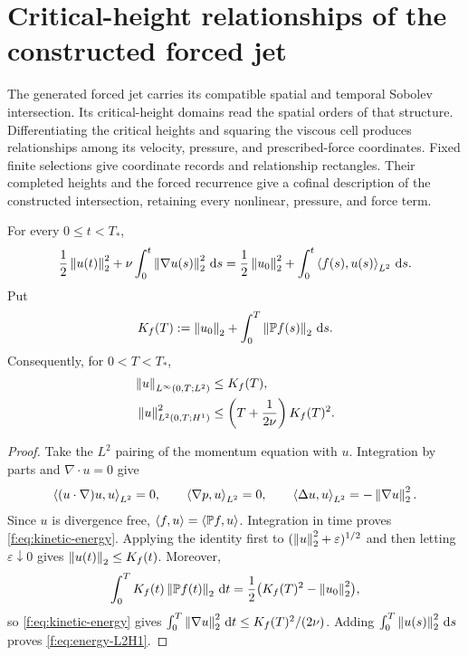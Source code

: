 \section{Critical-height relationships of the constructed forced jet}
\label{f:sec:compatible-rectangles}

The generated forced jet carries its compatible spatial and temporal Sobolev
intersection. Its critical-height domains read the spatial orders of that
structure. Differentiating the critical heights and squaring the viscous cell
produces relationships among its velocity, pressure, and prescribed-force
coordinates. Fixed finite selections give coordinate records and relationship
rectangles. Their completed heights and the forced recurrence give a cofinal
description of the constructed intersection, retaining every nonlinear,
pressure, and force term.


\begin{proposition}
\label{f:prop:kinetic-energy}
For every \(0\le t<T_*\),
\begin{equation}
 \frac12\left\lVert u(t)\right\rVert_2^2
 +\nu\int_0^t\left\lVert \nabla u(s)\right\rVert_2^2\,\mathrm d s
 =\frac12\left\lVert u_0\right\rVert_2^2
 +\int_0^t\left\langle f(s),u(s)\right\rangle_{L^2}\,\mathrm d s.
 \label{f:eq:kinetic-energy}
\end{equation}
Put
\[
 K_f(T):=\left\lVert u_0\right\rVert_2+\int_0^T\left\lVert \mathbb P f(s)\right\rVert_2\,\mathrm d s.
\]
Consequently, for \(0<T<T_*\),
\begin{align}
 \left\lVert u\right\rVert_{L^\infty(0,T;L^2)}&\le K_f(T),
 \label{f:eq:energy-Linf}\\
 \left\lVert u\right\rVert_{L^2(0,T;H^1)}^2
 &\le\left(T+\frac1{2\nu}\right)K_f(T)^2.
 \label{f:eq:energy-L2H1}
\end{align}
\end{proposition}

\begin{proof}
Take the \(L^2\) pairing of the momentum equation with \(u\).  Integration
by parts and \(\nabla\cdot u=0\) give
\[
 \left\langle (u\cdot\nabla)u,u\right\rangle_{L^2}=0,
 \qquad
 \left\langle \nabla p,u\right\rangle_{L^2}=0,
 \qquad
 \left\langle \Delta u,u\right\rangle_{L^2}=-\left\lVert \nabla u\right\rVert_2^2.
\]
Since \(u\) is divergence free,
\(\left\langle f,u\right\rangle=\left\langle \mathbb P f,u\right\rangle\).  Integration in time proves
\eqref{f:eq:kinetic-energy}.  Applying the identity first to
\((\left\lVert u\right\rVert_2^2+\varepsilon)^{1/2}\) and then letting
\(\varepsilon\downarrow0\) gives \(\left\lVert u(t)\right\rVert_2\le K_f(t)\).  Moreover,
\[
 \int_0^T K_f(t)\left\lVert \mathbb P f(t)\right\rVert_2\,\mathrm d t
 =\frac12\bigl(K_f(T)^2-\left\lVert u_0\right\rVert_2^2\bigr),
\]
so \eqref{f:eq:kinetic-energy} gives
\(\int_0^T\left\lVert \nabla u\right\rVert_2^2\,\mathrm d t\le K_f(T)^2/(2\nu)\).
Adding \(\int_0^T\left\lVert u(s)\right\rVert_2^2\,\mathrm d s\) proves
\eqref{f:eq:energy-L2H1}.
\end{proof}

